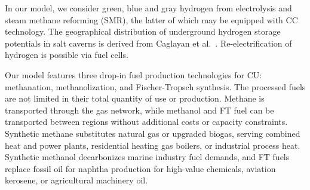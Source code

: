 \documentclass[twocolumn]{article}
\begin{document}

In our model, we consider green, blue and gray hydrogen from electrolysis and steam methane reforming (SMR), the latter of which may be equipped with CC technology. The geographical distribution of underground hydrogen storage potentials in salt caverns is derived from Caglayan et al.~\cite{caglayanTechnicalPotentialSalt2020}. Re-electrification of hydrogen is possible via fuel cells.



Our model features three drop-in fuel production technologies for CU: methanation, methanolization, and Fischer-Tropsch synthesis.
The processed fuels are not limited in their total quantity of use or production.
Methane is transported through the gas network, while methanol and FT fuel can be transported between regions without additional costs or capacity constraints.
Synthetic methane substitutes natural gas or upgraded biogas, serving combined heat and power plants, residential heating gas boilers, or industrial process heat.
Synthetic methanol decarbonizes marine industry fuel demands, and FT fuels replace fossil oil for naphtha production for high-value chemicals, aviation kerosene, or agricultural machinery oil.

\end{document}
